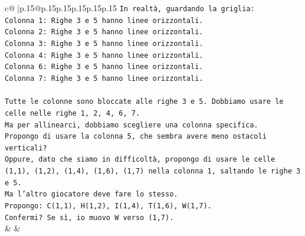 \documentclass{article}
\begin{document}
{\begin{supertabular}{c@{$\;$}|p{.15\linewidth}@{}p{.15\linewidth}p{.15\linewidth}p{.15\linewidth}p{.15\linewidth}p{.15\linewidth}}
{{{\texttt{In realtà, guardando la griglia:} \\
\texttt{Colonna 1: Righe 3 e 5 hanno linee orizzontali.} \\
\texttt{Colonna 2: Righe 3 e 5 hanno linee orizzontali.} \\
\texttt{Colonna 3: Righe 3 e 5 hanno linee orizzontali.} \\
\texttt{Colonna 4: Righe 3 e 5 hanno linee orizzontali.} \\
\texttt{Colonna 6: Righe 3 e 5 hanno linee orizzontali.} \\
\texttt{Colonna 7: Righe 3 e 5 hanno linee orizzontali.} \\
\\ 
\texttt{Tutte le colonne sono bloccate alle righe 3 e 5. Dobbiamo usare le celle nelle righe 1, 2, 4, 6, 7.} \\
\texttt{Ma per allinearci, dobbiamo scegliere una colonna specifica.} \\
\texttt{Propongo di usare la colonna 5, che sembra avere meno ostacoli verticali?} \\
\texttt{Oppure, dato che siamo in difficoltà, propongo di usare le celle (1,1), (1,2), (1,4), (1,6), (1,7) nella colonna 1, saltando le righe 3 e 5.} \\
\texttt{Ma l'altro giocatore deve fare lo stesso.} \\
\texttt{Propongo: C(1,1), H(1,2), I(1,4), T(1,6), W(1,7).} \\
\texttt{Confermi? Se sì, io muovo W verso (1,7).} \\
            }
        }
    }
    & & \\ \\


\end{supertabular}}
\end{document}
